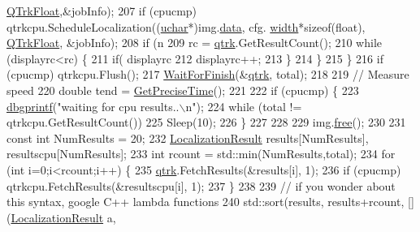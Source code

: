 \begin{DoxyCode}
      \hyperlink{qtrk__c__api_8h_aad82367b3ea592a142bb50a2fb538b0bafeece00bcf1a42419e686ef0cf006a4e}{QTrkFloat},&jobInfo);
207         \textcolor{keywordflow}{if} (cpucmp) qtrkcpu.ScheduleLocalization((\hyperlink{std__incl_8h_a65f85814a8290f9797005d3b28e7e5fc}{uchar}*)img.\hyperlink{struct_t_image_data_a78c7415ecee3965da7e25149cea6f4d8}{data}, cfg.
      \hyperlink{struct_q_trk_settings_aef24eb3a4692bd67ff1aca8ef950e08d}{width}*\textcolor{keyword}{sizeof}(\textcolor{keywordtype}{float}), \hyperlink{qtrk__c__api_8h_aad82367b3ea592a142bb50a2fb538b0bafeece00bcf1a42419e686ef0cf006a4e}{QTrkFloat}, &jobInfo);
208         \textcolor{keywordflow}{if} (n %
209             rc = \hyperlink{namespaceqtrk}{qtrk}.GetResultCount();
210             \textcolor{keywordflow}{while} (displayrc<rc) \{
211                 \textcolor{keywordflow}{if}( displayrc%
212                 displayrc++;
213             \}
214         \}
215     \}
216     \textcolor{keywordflow}{if} (cpucmp) qtrkcpu.Flush();
217     \hyperlink{_shared_tests_8h_ad10b5a63fc1239e5638eae0f0ea30f84}{WaitForFinish}(&\hyperlink{namespaceqtrk}{qtrk}, total);
218     
219     \textcolor{comment}{// Measure speed}
220     \textcolor{keywordtype}{double} tend = \hyperlink{utils_8cpp_a11abc9edca3542dd4e74dadf99340fa1}{GetPreciseTime}();
221 
222     \textcolor{keywordflow}{if} (cpucmp) \{
223         \hyperlink{utils_8cpp_a4a7132c90e490d24edecb391a754a9c0}{dbgprintf}(\textcolor{stringliteral}{"waiting for cpu results..\(\backslash\)n"});
224         \textcolor{keywordflow}{while} (total != qtrkcpu.GetResultCount())
225             Sleep(10);
226     \}
227     
228 
229     img.\hyperlink{struct_t_image_data_a60a60e309657216a2e35809fdc582b11}{free}();
230 
231     \textcolor{keyword}{const} \textcolor{keywordtype}{int} NumResults = 20;
232     \hyperlink{struct_localization_result}{LocalizationResult} results[NumResults], resultscpu[NumResults];
233     \textcolor{keywordtype}{int} rcount = std::min(NumResults,total);
234     \textcolor{keywordflow}{for} (\textcolor{keywordtype}{int} i=0;i<rcount;i++) \{
235         \hyperlink{namespaceqtrk}{qtrk}.FetchResults(&results[i], 1);
236         \textcolor{keywordflow}{if} (cpucmp) qtrkcpu.FetchResults(&resultscpu[i], 1);
237     \}
238 
239     \textcolor{comment}{// if you wonder about this syntax, google C++ lambda functions}
240     std::sort(results, results+rcount, [](\hyperlink{struct_localization_result}{LocalizationResult} a, 

\end{DoxyCode}

